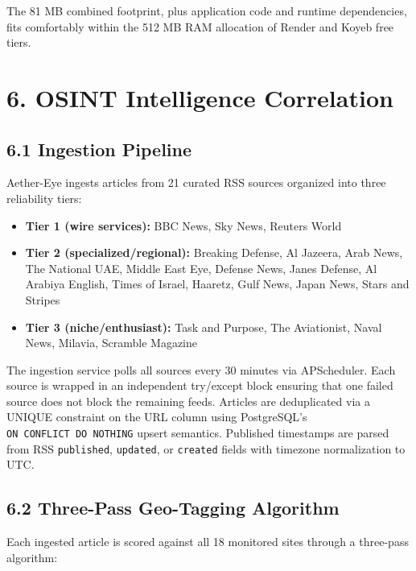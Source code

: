 \documentclass[11pt,a4paper]{article}
\providecommand{\tightlist}{\setlength{\itemsep}{0pt}\setlength{\parskip}{0pt}}
\begin{document}
The 81 MB combined footprint, plus application code and runtime dependencies, fits comfortably within the 512 MB RAM allocation of Render and Koyeb free tiers.

\hypertarget{osint-intelligence-correlation}{%
\section{6. OSINT Intelligence Correlation}\label{osint-intelligence-correlation}}

\hypertarget{ingestion-pipeline}{%
\subsection{6.1 Ingestion Pipeline}\label{ingestion-pipeline}}

Aether-Eye ingests articles from 21 curated RSS sources organized into three reliability tiers:

\begin{itemize}
\tightlist
\item
  \textbf{Tier 1 (wire services):} BBC News, Sky News, Reuters World
\item
  \textbf{Tier 2 (specialized/regional):} Breaking Defense, Al Jazeera, Arab News, The National UAE, Middle East Eye, Defense News, Janes Defense, Al Arabiya English, Times of Israel, Haaretz, Gulf News, Japan News, Stars and Stripes
\item
  \textbf{Tier 3 (niche/enthusiast):} Task and Purpose, The Aviationist, Naval News, Milavia, Scramble Magazine
\end{itemize}

The ingestion service polls all sources every 30 minutes via APScheduler. Each source is wrapped in an independent try/except block ensuring that one failed source does not block the remaining feeds. Articles are deduplicated via a UNIQUE constraint on the URL column using PostgreSQL's \texttt{ON\ CONFLICT\ DO\ NOTHING} upsert semantics. Published timestamps are parsed from RSS \texttt{published}, \texttt{updated}, or \texttt{created} fields with timezone normalization to UTC.

\hypertarget{three-pass-geo-tagging-algorithm}{%
\subsection{6.2 Three-Pass Geo-Tagging Algorithm}\label{three-pass-geo-tagging-algorithm}}

Each ingested article is scored against all 18 monitored sites through a three-pass algorithm:
\end{document}
